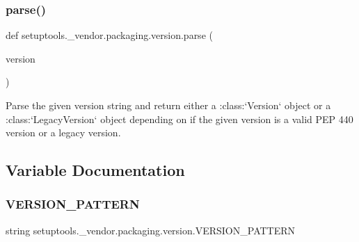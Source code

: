\subsubsection{\texorpdfstring{parse()}{parse()}}
{\footnotesize\ttfamily def setuptools.\+\_\+vendor.\+packaging.\+version.\+parse (\begin{DoxyParamCaption}\item[{}]{version }\end{DoxyParamCaption})}

\begin{DoxyVerb}Parse the given version string and return either a :class:`Version` object
or a :class:`LegacyVersion` object depending on if the given version is
a valid PEP 440 version or a legacy version.
\end{DoxyVerb}
 

\subsection{Variable Documentation}
\mbox{\label{namespacesetuptools_1_1__vendor_1_1packaging_1_1version_ad46cecc46feb4de88da267346b09be3e}} 
\subsubsection{\texorpdfstring{V\+E\+R\+S\+I\+O\+N\+\_\+\+P\+A\+T\+T\+E\+RN}{VERSION\_PATTERN}}
{\footnotesize\ttfamily string setuptools.\+\_\+vendor.\+packaging.\+version.\+V\+E\+R\+S\+I\+O\+N\+\_\+\+P\+A\+T\+T\+E\+RN}

